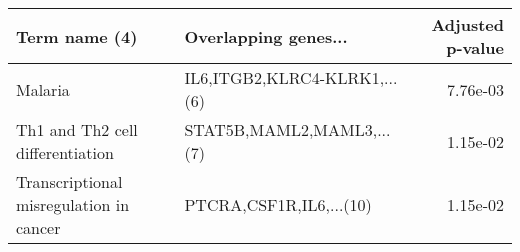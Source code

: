 \begin{tabular}{llr}
\toprule
                          Term name (4) &         Overlapping genes... &  Adjusted p-value \\
\midrule
                                Malaria & IL6,ITGB2,KLRC4-KLRK1,...(6) &          7.76e-03 \\
       Th1 and Th2 cell differentiation &    STAT5B,MAML2,MAML3,...(7) &          1.15e-02 \\
Transcriptional misregulation in cancer &      PTCRA,CSF1R,IL6,...(10) &          1.15e-02 \\
\bottomrule
\end{tabular}
